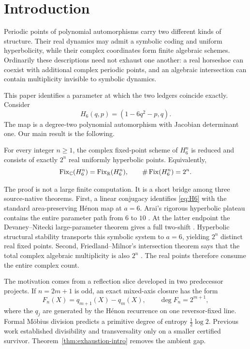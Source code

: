 \section{Introduction}

Periodic points of polynomial automorphisms carry two different kinds of
structure.  Their real dynamics may admit a symbolic coding and uniform
hyperbolicity, while their complex coordinates form finite algebraic
schemes.  Ordinarily these descriptions need not exhaust one another: a
real horseshoe can coexist with additional complex periodic points, and an
algebraic intersection can contain multiplicity invisible to symbolic
dynamics.

This paper identifies a parameter at which the two ledgers coincide exactly.
Consider
\begin{equation}\label{eq:H6}
H_6(q,p)=(1-6q^2-p,q).
\end{equation}
The map is a degree-two polynomial automorphism with Jacobian determinant
one.  Our main result is the following.

\begin{theorem}\label{thm:exhaustion-intro}
For every integer $n\ge1$, the complex fixed-point scheme of $H_6^n$ is
reduced and consists of exactly $2^n$ real uniformly hyperbolic points.
Equivalently,
\[
\operatorname{Fix}_{\mathbb C}(H_6^n)=\operatorname{Fix}_{\mathbb R}(H_6^n),
\qquad \#\operatorname{Fix}(H_6^n)=2^n.
\]
\end{theorem}

The proof is not a large finite computation.  It is a short bridge among
three source-native theorems.  First, a linear conjugacy identifies
\eqref{eq:H6} with the standard area-preserving H\'enon map at $a=6$.
Arai's rigorous hyperbolic plateau contains the entire parameter path from
$6$ to $10$ \cite{Arai2007}.  At the latter endpoint the
Devaney--Nitecki large-parameter theorem gives a full two-shift
\cite{DevaneyNitecki1979}.  Hyperbolic structural stability transports this
symbolic system to $a=6$, yielding $2^n$ distinct real fixed points.  Second,
Friedland--Milnor's intersection theorem says that the total complex
algebraic multiplicity is also $2^n$ \cite{FriedlandMilnor1989}.  The real
points therefore consume the entire complex count.

The motivation comes from a reflection slice developed in two predecessor
projects.  If $n=2m+1$ is odd, an exact mixed-axis closure has the form
\begin{equation}\label{eq:Fn-intro}
F_n(X)=q_{m+1}(X)-q_m(X),\qquad \deg F_n=2^{m+1},
\end{equation}
where the $q_j$ are generated by the H\'enon recurrence on one reversor-fixed
line.  Formal M\"obius division predicts a primitive degree of entropy
$\tfrac12\log2$.  Previous work established divisibility and transversality
only on a smaller certified survivor.  Theorem~\ref{thm:exhaustion-intro}
removes the ambient gap.

